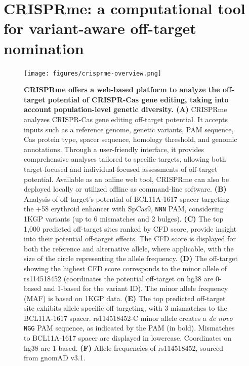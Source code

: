 \documentclass[a4paper, titlepage, openright]{book}
\newcommand{\crisprme}{CRISPRme\xspace}
\begin{document}
\section{\crisprme: a computational tool for variant-aware off-target nomination} 

\begin{figure}[!]
    \centering
    \texttt{[image: figures/crisprme-overview.png]}
    \caption[\crisprme offers a web-based platform to analyze the off-target potential of CRISPR-Cas gene editing, taking into account population-level genetic diversity]{\textbf{\crisprme offers a web-based platform to analyze the off-target potential of CRISPR-Cas gene editing, taking into account population-level genetic diversity. (A)} \crisprme analyzes CRISPR-Cas gene editing off-target potential. It accepts inputs such as a reference genome, genetic variants, PAM sequence, Cas protein type, spacer sequence, homology threshold, and genomic annotations. Through a user-friendly interface, it provides comprehensive analyses tailored to specific targets, allowing both target-focused and individual-focused assessments of off-target potential. Available as an online web tool, CRISPRme can also be deployed locally or utilized offline as command-line software. \textbf{(B)} Analysis of off-target's potential of BCL11A-1617 spacer targeting the +58 erythroid enhancer with SpCas9, \texttt{NNN} PAM, considering 1KGP variants (up to 6 mismatches and 2 bulges). \textbf{(C)} The top 1,000 predicted off-target sites ranked by CFD score, provide insight into their potential off-target effects. The CFD score is displayed for both the reference and alternative allele, where applicable, with the size of the circle representing the allele frequency. \textbf{(D)} The off-target showing the highest CFD score corresponds to the minor allele of rs114518452 (coordinates the potential off-target on hg38 are 0-based and 1-based for the variant ID). The minor allele frequency (MAF) is based on 1KGP data. \textbf{(E)} The top predicted off-target site exhibits allele-specific off-targeting, with 3 mismatches to the BCL11A-1617 spacer. rs114518452-C minor allele creates a \emph{de novo} \texttt{NGG} PAM sequence, as indicated by the PAM (in bold). Mismatches to BCL11A-1617 spacer are displayed in lowercase. Coordinates on hg38 are 1-based. \textbf{(F)} Allele frequencies of rs114518452, sourced from gnomAD v3.1.}
    \label{fig:crisprme-overview}
\end{figure}
\end{document}
